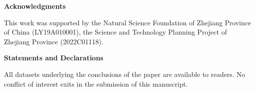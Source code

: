 \documentclass[12pt]{amsart}
\theoremstyle{definition}
\begin{document}

\begin{center}{\textbf{Acknowledgments}}
\end{center}
This work was supported by the Natural Science
Foundation of Zhejiang Province of China (LY19A010001), the Science
and Technology Planning Project of Zhejiang Province
(2022C01118).

\begin{center} {\textbf{Statements and Declarations}}
\end{center}
 All datasets underlying the conclusions of the paper are available
to readers. No conflict of interest exits in the submission of this
manuscript.
\end{document}

